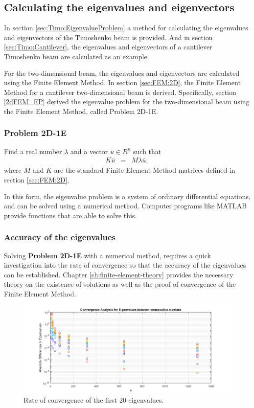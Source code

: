 \documentclass[../../main.tex]{subfiles}
\begin{document}
\subsection{Calculating the eigenvalues and eigenvectors}
In section \ref{sec:Timo:EigenvalueProblem} a method for calculating the eigenvalues and eigenvectors of the Timoshenko beam is provided. And in section \ref{sec:Timo:Cantilever}, the eigenvalues and eigenvectors of a cantilever Timoshenko beam are calculated as an example. 

For the two-dimensional beam, the eigenvalues and eigenvectors are calculated using the Finite Element Method. In section \ref{sec:FEM:2D}, the Finite Element Method for a cantilever two-dimensional beam is derived. Specifically, section \ref{2dFEM_EP} derived the eigenvalue problem for the two-dimensional beam using the Finite Element Method, called Problem 2D-1E.

\subsubsection{Problem 2D-1E}
Find a real number $\lambda$ and a vector $\bar{u} \in R^n$ such that
\begin{eqnarray}
	K\bar{u} & = & M\lambda{\bar{u}},
\end{eqnarray} where $M$ and $K$ are the standard Finite Element Method matrices defined in section \ref{sec:FEM:2D}.

In this form, the eigenvalue problem is a system of ordinary differential equations, and can be solved using a numerical method. Computer programs like MATLAB provide functions that are able to solve this.

\subsubsection{Accuracy of the eigenvalues}
Solving \textbf{Problem 2D-1E} with a numerical method, requires a quick investigation into the rate of convergence so that the accuracy of the eigenvalues can be established. Chapter \ref{ch:finite-element-theory} provides the necessary theory on the existence of solutions as well as the proof of convergence of the Finite Element Method.

\begin{figure}[H]
    \centering
    \begin{adjustbox}{center}
        \includegraphics[scale=0.7]{Convergence.png}
    \end{adjustbox}
    \caption{Rate of convergence of the first 20 eigenvalues.}
    \label{fig:conv_2d_eig}
\end{figure}
\end{document}
